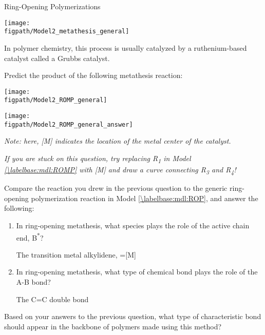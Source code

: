 \begin{activity}{Ring-Opening Polymerizations}
\begin{model}
	\centerline{\texttt{[image: \\figpath/Model2\_metathesis\_general]}}
	
	In polymer chemistry, this process is usually catalyzed by a ruthenium-based catalyst called a Grubbs catalyst.
	
\end{model}

\begin{ctqs}
	
	\question Predict the product of the following metathesis reaction: \label{\labelbase:ctq:metathesis1}
	
		\begin{solution}[1.25in]{
			\centerline{\texttt{[image: \\figpath/Model2\_ROMP\_general]}}
		}
			\centerline{\texttt{[image: \\figpath/Model2\_ROMP\_general\_answer]}}
		\end{solution}
		
		\emph{Note: here, [M] indicates the location of the metal center of the catalyst.}
		
		\emph{If you are stuck on this question, try replacing R\textsubscript{1} in Model \ref{\labelbase:mdl:ROMP} with [M] and draw a curve connecting R\textsubscript{3} and R\textsubscript{4}!}
		
	\question Compare the reaction you drew in the previous question to the generic ring-opening polymerization reaction in Model \ref{\labelbase:mdl:ROP}, and answer the following:
	
		\begin{enumerate}
			\item In ring-opening metathesis, what species plays the role of the active chain end, B\textsuperscript{*}?
			
				\begin{solution}[0.5in]{}
					The transition metal alkylidene, =[M]
				\end{solution}
				
			\item In ring-opening metathesis, what type of chemical bond plays the role of the A-B bond?
			
				\begin{solution}[0.5in]{}
					The C=C double bond
				\end{solution}
				
		\end{enumerate}
		
	\question Based on your answers to the previous question, what type of characteristic bond should appear in the backbone of polymers made using this method?
			

\end{ctqs}
\end{activity}
